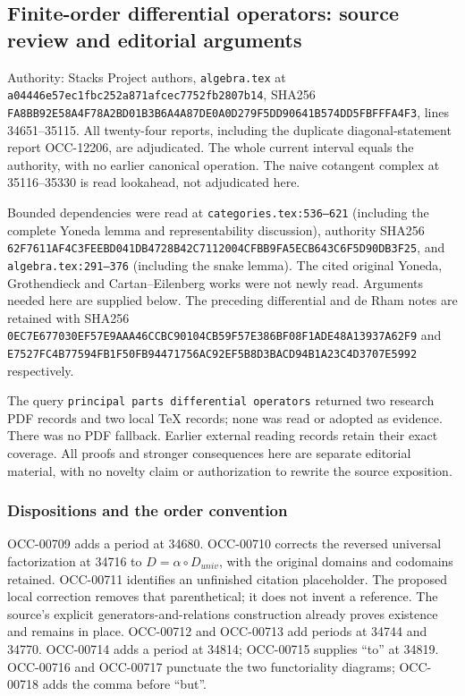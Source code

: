 \subsection{Finite-order differential operators: source review and editorial arguments}\label{finite-order-differential-operators-source-review-and-editorial-arguments}

Authority: Stacks Project authors, \texttt{algebra.tex} at \texttt{a04446e57ec1fbc252a871afcec7752fb2807b14}, SHA256 \texttt{FA8BB92E58A4F78A2BD01B3B6A4A87DE0A0D279F5DD90641B574DD5FBFFFA4F3}, lines 34651--35115. All twenty-four reports, including the duplicate diagonal-statement report OCC-12206, are adjudicated. The whole current interval equals the authority, with no earlier canonical operation. The naive cotangent complex at 35116--35330 is read lookahead, not adjudicated here.

Bounded dependencies were read at \texttt{categories.tex:536–621} (including the complete Yoneda lemma and representability discussion), authority SHA256 \texttt{62F7611AF4C3FEEBD041DB4728B42C7112004CFBB9FA5ECB643C6F5D90DB3F25}, and \texttt{algebra.tex:291–376} (including the snake lemma). The cited original Yoneda, Grothendieck and Cartan--Eilenberg works were not newly read. Arguments needed here are supplied below. The preceding differential and de Rham notes are retained with SHA256 \texttt{0EC7E677030EF57E9AAA46CCBC90104CB59F57E386BF08F1ADE48A13937A62F9} and \texttt{E7527FC4B77594FB1F50FB94471756AC92EF5B8D3BACD94B1A23C4D3707E5992} respectively.

The query \texttt{principal\ parts\ differential\ operators} returned two research PDF records and two local TeX records; none was read or adopted as evidence. There was no PDF fallback. Earlier external reading records retain their exact coverage. All proofs and stronger consequences here are separate editorial material, with no novelty claim or authorization to rewrite the source exposition.

\subsubsection{Dispositions and the order convention}\label{dispositions-and-the-order-convention}

OCC-00709 adds a period at 34680. OCC-00710 corrects the reversed universal factorization at 34716 to \(D=\alpha\circ D_{univ}\), with the original domains and codomains retained. OCC-00711 identifies an unfinished citation placeholder. The proposed local correction removes that parenthetical; it does not invent a reference. The source's explicit generators-and-relations construction already proves existence and remains in place. OCC-00712 and OCC-00713 add periods at 34744 and 34770. OCC-00714 adds a period at 34814; OCC-00715 supplies ``to'' at 34819. OCC-00716 and OCC-00717 punctuate the two functoriality diagrams; OCC-00718 adds the comma before ``but''.

